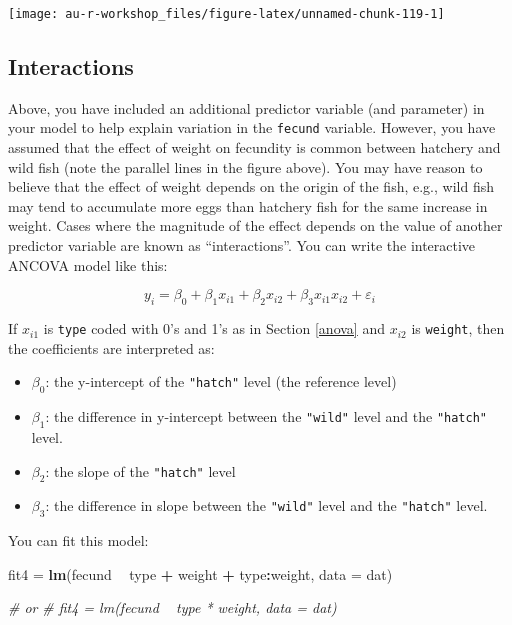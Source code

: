 \documentclass[]{book}
\newenvironment{Shaded}{\begin{snugshade}}{\end{snugshade}}
\newcommand{\KeywordTok}[1]{\textcolor[rgb]{0.13,0.29,0.53}{\textbf{#1}}}
\newcommand{\DataTypeTok}[1]{\textcolor[rgb]{0.13,0.29,0.53}{#1}}
\newcommand{\StringTok}[1]{\textcolor[rgb]{0.31,0.60,0.02}{#1}}
\newcommand{\CommentTok}[1]{\textcolor[rgb]{0.56,0.35,0.01}{\textit{#1}}}
\newcommand{\OperatorTok}[1]{\textcolor[rgb]{0.81,0.36,0.00}{\textbf{#1}}}
\newcommand{\NormalTok}[1]{#1}
\providecommand{\tightlist}{%
  \setlength{\itemsep}{0pt}\setlength{\parskip}{0pt}}
\theoremstyle{definition}
\theoremstyle{definition}
\theoremstyle{definition}
\theoremstyle{remark}
\begin{document}
\begin{center}\texttt{[image: au-r-workshop\_files/figure-latex/unnamed-chunk-119-1]} \end{center}

\subsection{Interactions}\label{interactions}

Above, you have included an additional predictor variable (and
parameter) in your model to help explain variation in the
\texttt{fecund} variable. However, you have assumed that the effect of
weight on fecundity is common between hatchery and wild fish (note the
parallel lines in the figure above). You may have reason to believe that
the effect of weight depends on the origin of the fish, e.g., wild fish
may tend to accumulate more eggs than hatchery fish for the same
increase in weight. Cases where the magnitude of the effect depends on
the value of another predictor variable are known as ``interactions''.
You can write the interactive ANCOVA model like this:

\begin{equation}
  y_i=\beta_0 + \beta_1 x_{i1} + \beta_2 x_{i2} + \beta_3 x_{i1} x_{i2} + \varepsilon_i
\label{eq:ancova-interact}
\end{equation}

If \(x_{i1}\) is \texttt{type} coded with 0's and 1's as in Section
\ref{anova} and \(x_{i2}\) is \texttt{weight}, then the coefficients are
interpreted as:

\begin{itemize}
\tightlist
\item
  \(\beta_0\): the y-intercept of the \texttt{"hatch"} level (the
  reference level)
\item
  \(\beta_1\): the difference in y-intercept between the \texttt{"wild"}
  level and the \texttt{"hatch"} level.
\item
  \(\beta_2\): the slope of the \texttt{"hatch"} level
\item
  \(\beta_3\): the difference in slope between the \texttt{"wild"} level
  and the \texttt{"hatch"} level.
\end{itemize}

You can fit this model:

\begin{Shaded}
\begin{Highlighting}[]
\NormalTok{fit4 =}\StringTok{ }\KeywordTok{lm}\NormalTok{(fecund }\OperatorTok{~}\StringTok{ }\NormalTok{type }\OperatorTok{+}\StringTok{ }\NormalTok{weight }\OperatorTok{+}\StringTok{ }\NormalTok{type}\OperatorTok{:}\NormalTok{weight, }\DataTypeTok{data =}\NormalTok{ dat)}

\CommentTok{# or}
\CommentTok{# fit4 = lm(fecund ~ type * weight, data = dat)}
\end{Highlighting}
\end{Shaded}
\end{document}
